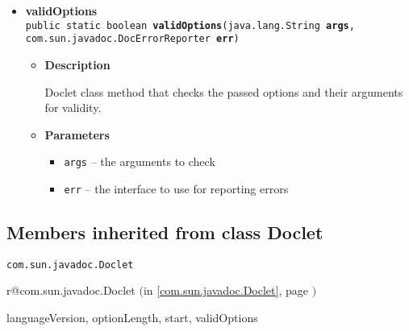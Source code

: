 \documentclass[11pt,a4paper]{report}
\makeatletter
\newcommand{\refdefined}[1]{
\expandafter\ifx\csname r@#1\endcsname\relax
\relax\else
{$($in \ref{#1}, page \pageref{#1}$)$}\fi}
\makeatother
\begin{document}
{{\begin{itemize}
{\begin{itemize}
{Doclet class method that is called by the framework to format the entire document
}
\item{
{\bf  Parameters}
  \begin{itemize}
   \item{
\texttt{root} -- the root of the starting document}
  \end{itemize}
}%
\end{itemize}
}%
\item{ 
\hypertarget{org.stfm.texdoclet.TeXDoclet.validOptions(java.lang.String[][], com.sun.javadoc.DocErrorReporter)}{{\bf  validOptions}\\}
\texttt{public static boolean\ {\bf  validOptions}(\texttt{java.lang.String\lbrack \rbrack \lbrack \rbrack } {\bf  args},
\texttt{com.sun.javadoc.DocErrorReporter} {\bf  err})
\label{org.stfm.texdoclet.TeXDoclet.validOptions(java.lang.String[][], com.sun.javadoc.DocErrorReporter)}}%
\begin{itemize}
\item{
{\bf  Description}

Doclet class method that checks the passed options and their arguments for validity.
}
\item{
{\bf  Parameters}
  \begin{itemize}
   \item{
\texttt{args} -- the arguments to check}
   \item{
\texttt{err} -- the interface to use for reporting errors}
  \end{itemize}
}%
\end{itemize}
}%
\end{itemize}
}
\subsection{Members inherited from class Doclet }{
\texttt{com.sun.javadoc.Doclet} {\small 
\refdefined{com.sun.javadoc.Doclet}}
{\small 

languageVersion, optionLength, start, validOptions}
}
}
\end{document}
